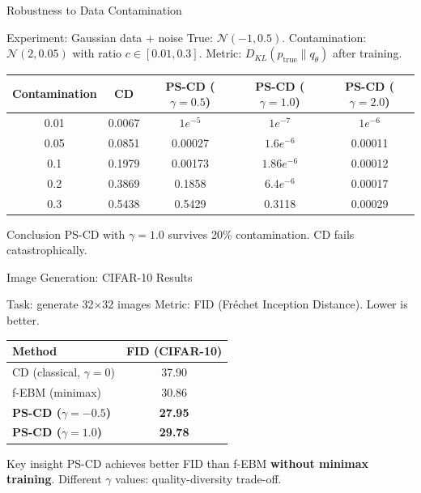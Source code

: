 \documentclass{beamer}
\begin{document}
\begin{frame}{Robustness to Data Contamination}
\small
\begin{block}{Experiment: Gaussian data + noise}
True: $\mathcal{N}(-1, 0.5)$. Contamination: $\mathcal{N}(2, 0.05)$ with ratio $c \in [0.01, 0.3]$.
Metric: $D_{KL}(p_{\text{true}} \| q_\theta)$ after training.
\end{block}

\begin{table}
\centering
\tiny
\begin{tabular}{|c|c|c|c|c|}
\hline
Contamination & CD & PS-CD ($\gamma=0.5$) & PS-CD ($\gamma=1.0$) & PS-CD ($\gamma=2.0$) \\
\hline
0.01 & 0.0067 & $1e^{-5}$ & $1e^{-7}$ & $1e^{-6}$ \\
0.05 & 0.0851 & 0.00027 & $1.6e^{-6}$ & 0.00011 \\
0.1 & 0.1979 & 0.00173 & $1.86e^{-6}$ & 0.00012 \\
0.2 & 0.3869 & 0.1858 & $6.4e^{-6}$ & 0.00017 \\
0.3 & 0.5438 & 0.5429 & 0.3118 & 0.00029 \\
\hline
\end{tabular}
\end{table}

\begin{block}{Conclusion}
PS-CD with $\gamma=1.0$ survives 20\% contamination. CD fails catastrophically.
\end{block}
\end{frame}

\begin{frame}{Image Generation: CIFAR-10 Results}
\small
\begin{block}{Task: generate 32×32 images}
Metric: FID (Fréchet Inception Distance). Lower is better.
\end{block}

\begin{table}
\centering

\begin{tabular}{|l|c|}
\hline
\textbf{Method} & \textbf{FID (CIFAR-10)} \\
\hline
CD (classical, $\gamma=0$) & 37.90 \\
f-EBM (minimax) & 30.86 \\
\textbf{PS-CD ($\gamma = -0.5$)} & \textbf{27.95} \\
\textbf{PS-CD ($\gamma = 1.0$)} & \textbf{29.78} \\
\hline
\end{tabular}
\end{table}

\begin{block}{Key insight}
PS-CD achieves better FID than f-EBM \textbf{without minimax training}.
Different $\gamma$ values: quality-diversity trade-off.
\end{block}
\end{frame}
\end{document}
